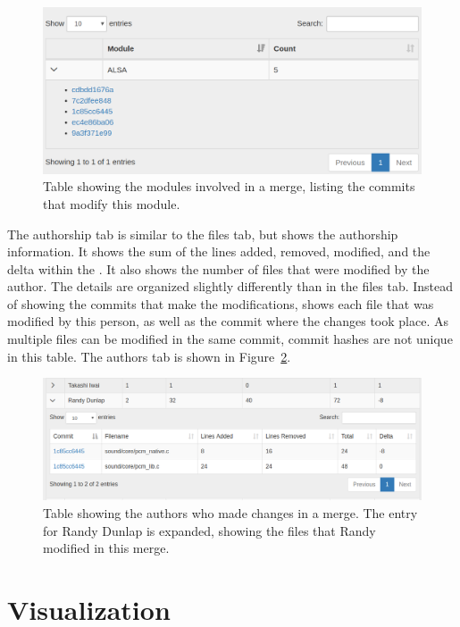 \begin{figure}[htpb]
  \centering
  \includegraphics[width=0.9\linewidth]{Figures/Linvis/linvis_modules.png}
  \caption{Table showing the modules involved in a merge, listing the
    commits that modify this module.}
  \label{fig:linvis_modules_results}
\end{figure}

The authorship tab is similar to the files tab,
but shows the authorship information.
It shows the sum of the lines added, removed, modified, and the delta
within the \mt{}.
It also shows the number of files that were modified by the author.
The details are organized slightly differently than in the files tab.
Instead of showing the commits that make the modifications, \tool{}
shows each file that was modified by this person, as well as the commit
where the changes took place.
As multiple files can be modified in the same commit,
commit hashes are not unique in this table.
The authors tab is shown in Figure~\ref{fig:linvis_authors_results}.

\begin{figure}[htpb]
  \centering
  \includegraphics[width=0.9\linewidth]{Figures/Linvis/linvis_authors.png}
  \caption{Table showing the authors who made changes in a merge. The
    entry for Randy Dunlap is expanded, showing the files that Randy
    modified in this merge.}
  \label{fig:linvis_authors_results}
\end{figure}

\section{Visualization}\label{sec:visualization}

